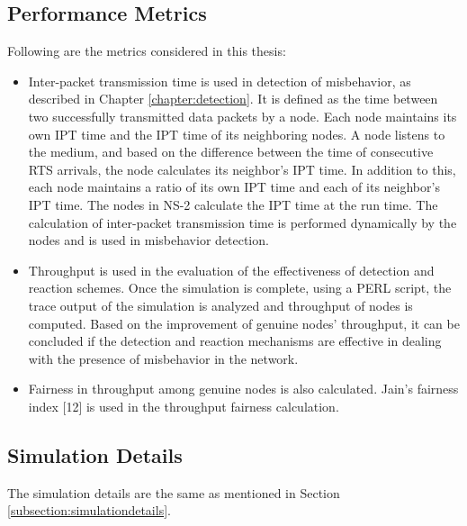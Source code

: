 \documentclass[12pt,letterpaper,english]{article}
\begin{document}
\subsection{Performance Metrics}
\indent Following are the metrics considered in this thesis:
\begin{itemize}
\item Inter-packet transmission time is used in detection of misbehavior, as described in Chapter \ref{chapter:detection}. 
It is defined as the time between two successfully transmitted data packets by a node. 
Each node maintains its own IPT time and the IPT time of its neighboring nodes.
A node listens to the medium, and based on the difference between the time of consecutive RTS arrivals, the node calculates its neighbor's IPT time. 
In addition to this, each node maintains a ratio of its own IPT time and each of its neighbor's IPT time. 
The nodes in NS-2 calculate the IPT time at the run time. 
The calculation of inter-packet transmission time is performed dynamically by the nodes and is used in misbehavior detection. 
\item Throughput is used in the evaluation of the effectiveness of detection and reaction schemes. 
Once the simulation is complete, using a PERL script, the trace output of the simulation is analyzed and throughput of nodes is computed. 
Based on the improvement of genuine nodes' throughput, it can be concluded if the detection and reaction mechanisms are effective in dealing with the presence of misbehavior in the network.
\item Fairness in throughput among genuine nodes is also calculated. Jain's fairness index 
[12] 
is used in the throughput fairness calculation.
\end{itemize}
\subsection{Simulation Details}
\indent The simulation details are the same as mentioned in Section \ref{subsection:simulationdetails}.
\end{document}
